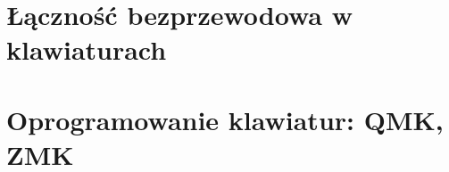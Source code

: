 \section{Łączność bezprzewodowa w klawiaturach}\label{sec:ble}

\section{Oprogramowanie klawiatur: QMK, ZMK}\label{sec:qmkzmk}

